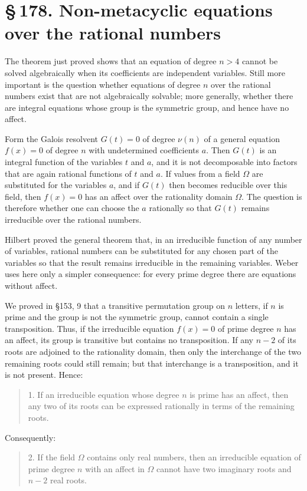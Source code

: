 \documentclass[11pt]{article}
\providecommand{\sect}[2]{\section*{\S\,#1. #2}}
\begin{document}
\sect{178}{Non-metacyclic equations over the rational numbers}

The theorem just proved shows that an equation of degree $n>4$ cannot be solved algebraically when its coefficients are independent variables. Still more important is the question whether equations of degree $n$ over the rational numbers exist that are not algebraically solvable; more generally, whether there are integral equations whose group is the symmetric group, and hence have no affect.

Form the Galois resolvent $G(t)=0$ of degree $\nu(n)$ of a general equation $f(x)=0$ of degree $n$ with undetermined coefficients $a$. Then $G(t)$ is an integral function of the variables $t$ and $a$, and it is not decomposable into factors that are again rational functions of $t$ and $a$. If values from a field $\Omega$ are substituted for the variables $a$, and if $G(t)$ then becomes reducible over this field, then $f(x)=0$ has an affect over the rationality domain $\Omega$. The question is therefore whether one can choose the $a$ rationally so that $G(t)$ remains irreducible over the rational numbers.

Hilbert proved the general theorem that, in an irreducible function of any number of variables, rational numbers can be substituted for any chosen part of the variables so that the result remains irreducible in the remaining variables. Weber uses here only a simpler consequence: for every prime degree there are equations without affect.

We proved in §153, 9 that a transitive permutation group on $n$ letters, if $n$ is prime and the group is not the symmetric group, cannot contain a single transposition. Thus, if the irreducible equation $f(x)=0$ of prime degree $n$ has an affect, its group is transitive but contains no transposition. If any $n-2$ of its roots are adjoined to the rationality domain, then only the interchange of the two remaining roots could still remain; but that interchange is a transposition, and it is not present. Hence:

\begin{quote}
1. If an irreducible equation whose degree $n$ is prime has an affect, then any two of its roots can be expressed rationally in terms of the remaining roots.
\end{quote}

Consequently:
\begin{quote}
2. If the field $\Omega$ contains only real numbers, then an irreducible equation of prime degree $n$ with an affect in $\Omega$ cannot have two imaginary roots and $n-2$ real roots.
\end{quote}
\end{document}
